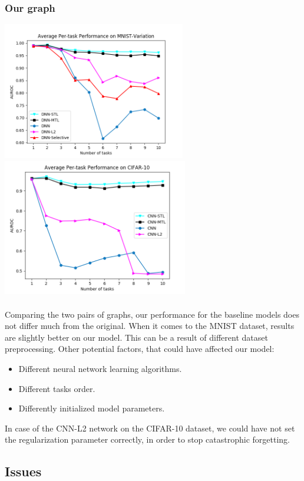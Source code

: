 \documentclass[12pt]{article}
\begin{document}
    \subsubsection{Our graph}
    \includegraphics[height=6cm]{fig1-v3.png}
    \includegraphics[height=6cm]{fig1-s.png}
    \\
    \\
    Comparing the two pairs of graphs, our performance for the baseline models does not differ much from
    the original. When it comes to the MNIST dataset, results are slightly better on our model. This can
    be a result of different dataset preprocessing. Other potential factors, that could have affected
    our model:
    \begin{itemize}
        \item Different neural network learning algorithms.
        \item Different tasks order.
        \item Differently initialized model parameters.
    \end{itemize}
    \bigskip
    In case of the CNN-L2 network on the CIFAR-10 dataset, we could have not set the regularization parameter
    correctly, in order to stop catastrophic forgetting.

    \subsection{Issues}
\end{document}

